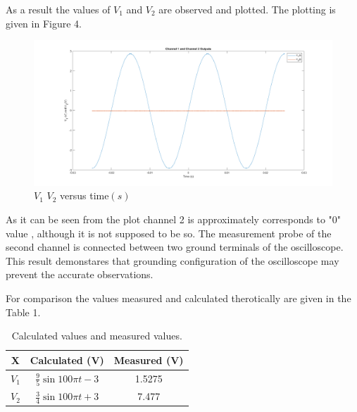 \documentclass[letterpaper,12pt]{article}
\begin{document}
As a result the values of \(V_1\) and \(V_2\) are observed and plotted. The plotting is given in Figure 4. 
\begin{figure}[H]
	\centering
   \includegraphics[width=1\textwidth]{1b.png}
   \caption{\(V_1\) \(V_2\) versus time\((s)\) }
\end{figure} 

As it can be seen from the plot channel 2 is approximately corresponds to "0" value , although it is not supposed to be so. The measurement probe of the second channel is connected between two ground terminals of the oscilloscope. This result demonstares that grounding configuration of the oscilloscope may prevent the accurate observations. 

For comparison the values measured and calculated therotically are given in the Table 1.
\begin{table}[H]
	\begin{center}
		\caption{Calculated values and measured values.}
		\vspace{2mm}
		\begin{tabular}{||c | c | c||} 
		 \hline 
		 X & Calculated (V) & Measured (V) \\ [0.5ex] 
		 \hline\hline
		 \(V_1\) & \( \frac{9}{5} \sin {100 \pi t } -3 \) & 1.5275  \\ 
		 \hline
		 \(V_2\) & \( \frac{3}{4} \sin {100 \pi t } +3 \) & 7.477  \\
		 \hline
		\end{tabular}
	\end{center}
\end{table}
\end{document}
